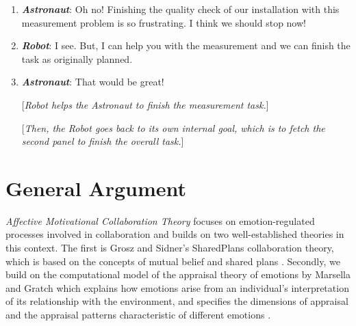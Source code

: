 \documentclass[12pt]{report}
\begin{document}
\begin{enumerate}
  \item \textit{\textbf{Astronaut}}: Oh no! Finishing the quality check of our
  installation with this measurement problem is so frustrating. I think we
  should stop now!

  \item \textit{\textbf{Robot}}: I see. But, I can help you with the measurement and we
  can finish the task as originally planned.

  \item \textit{\textbf{Astronaut}}: That would be great!

  [\textit{Robot helps the Astronaut to finish the measurement task.}]
  
  [\textit{Then, the Robot goes back to its own internal goal, which is to fetch
  the second panel to finish the overall task.}]

\end{enumerate}

\section{General Argument}

\textit{Affective Motivational Collaboration Theory} focuses on
emotion-regulated processes involved in collaboration and builds on two
well-established theories in this context. The first is Grosz and Sidner's
SharedPlans collaboration theory, which is based on the concepts of mutual
belief and shared plans \cite{grosz:shared-plans, grosz:plans-discourse}.
Secondly, we build on the computational model of the appraisal theory of
emotions by Marsella and Gratch \cite{gratch:domain-independent,
gratch:evaluating, marsella:ema-process-model, marsella:computational} which
explains how emotions arise from an individual's interpretation of its
relationship with the environment, and specifies the dimensions of appraisal and
the appraisal patterns characteristic of different emotions
\cite{scherer:appraisal-processes}.
\end{document}
